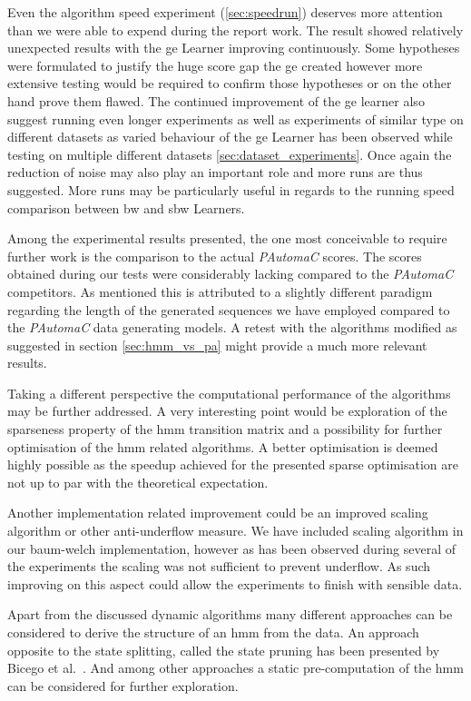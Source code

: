 Even the algorithm speed experiment (\ref{sec:speedrun}) deserves more attention than we were able to expend during the report work. The result showed relatively unexpected results with the \gls{ge} Learner improving continuously. Some hypotheses were formulated to justify the huge score gap the \gls{ge} created however more extensive testing would be required to confirm those hypotheses or on the other hand prove them flawed. The continued improvement of the \gls{ge} learner also suggest running even longer experiments as well as experiments of similar type on different datasets as varied behaviour of the \gls{ge} Learner has been observed while testing on multiple different datasets \ref{sec:dataset_experiments}. Once again the reduction of noise may also play an important role and more runs are thus suggested. More runs may be particularly useful in regards to the running speed comparison between \acrlong{bw} and \acrlong{sbw} Learners.

Among the experimental results presented, the one most conceivable to require further work is the comparison to the actual \emph{PAutomaC} scores. The scores obtained during our tests were considerably lacking compared to the \emph{PAutomaC} competitors. As mentioned this is attributed to a slightly different paradigm regarding the length of the generated sequences we have employed compared to the \emph{PAutomaC} data generating models. A retest with the algorithms modified as suggested in section \ref{sec:hmm_vs_pa} might provide a much more relevant results.

Taking a different perspective the computational performance of the algorithms may be further addressed. A very interesting point would be exploration of the sparseness property of the \gls{hmm} transition matrix and a possibility for further optimisation of the \gls{hmm} related algorithms. A better optimisation is deemed highly possible as the speedup achieved for the presented sparse optimisation are not up to par with the theoretical expectation.

Another implementation related improvement could be an improved scaling algorithm or other anti-underflow measure. We have included scaling algorithm in our \gls{baum-welch} implementation, however as has been observed during several of the experiments the scaling was not sufficient to prevent underflow. As such improving on this aspect could allow the experiments to finish with sensible data.

Apart from the discussed dynamic algorithms many different approaches can be considered to derive the structure of an \gls{hmm} from the data. An approach opposite to the state splitting, called the state pruning has been presented by Bicego et al.~\cite{bicego2003}. And among other approaches a static pre-computation of the \gls{hmm} can be considered for further exploration.

